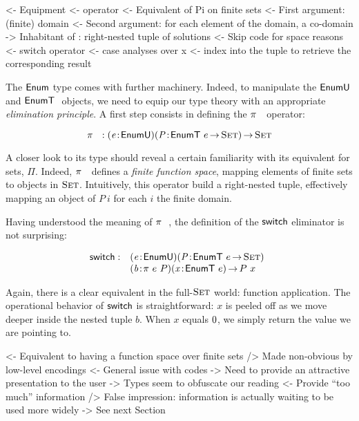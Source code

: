 \begin{wstructure}
<- Equipment
    <- \spi operator
        <- Equivalent of Pi on finite sets
        <- First argument: (finite) domain
        <- Second argument: for each element of the domain, a co-domain
        -> Inhabitant of \spi: right-nested tuple of solutions
            <- Skip code for space reasons
    <- switch operator
        <- case analyses over x
        <- index into the \spi tuple to retrieve the corresponding result
\end{wstructure}

The $\Enum$ type comes with further machinery. Indeed, to manipulate
the $\EnumU$ and $\EnumT{}$ objects, we need to equip our type theory
with an appropriate \emph{elimination principle}. A first step
consists in defining the $\spi{}{}$ operator:

\[
\spi{}{} : \PITEL{\V{e}}{\EnumU}
           \PITEL{\V{P}}{\EnumT{e} \To \Set} \To \Set 
\]

A closer look to its type should reveal a certain familiarity with its
equivalent for sets, $\Pi$. Indeed, $\spi{}{}$ defines a \emph{finite
  function space}, mapping elements of finite sets to objects in
$\Set$. Intuitively, this operator build a right-nested tuple,
effectively mapping an object of $P\:i$ for each $i$ the finite
domain.

Having understood the meaning of $\spi{}{}$, the definition of the
$\F{switch}$ eliminator is not surprising:

\[
\begin{array}{@{}ll}
\F{switch} : & \PITEL{\V{e}}{\EnumU}
               \PITEL{\V{P}}{\EnumT{e} \To \Set} \\
             & \PITEL{\V{b}}{\spi{e}{P}}
               \PITEL{\V{x}}{\EnumT{e}} \To P~x
\end{array}
\]

Again, there is a clear equivalent in the full-$\Set$ world: function
application. The operational behavior of $\F{switch}$ is
straightforward: $x$ is peeled off as we move deeper inside the nested
tuple $b$. When $x$ equals $\Ze$, we simply return the value we are
pointing to.

\begin{wstructure}
<- Equivalent to having a function space over finite sets
    /> Made non-obvious by low-level encodings
        <- General issue with codes
             -> Need to provide an attractive presentation to the user
    -> Types seem to obfuscate our reading
        <- Provide ``too much'' information
        /> False impression: information is actually waiting to be used more widely
        -> See next Section
\end{wstructure}

